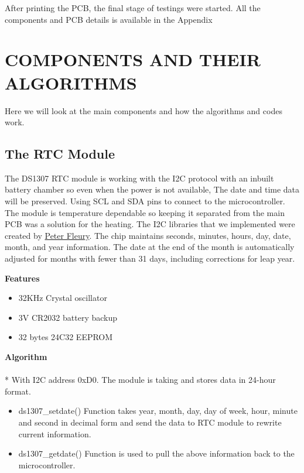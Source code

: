 After printing the PCB, the final stage of testings were started. All the components and PCB details is available in the Appendix

\section{COMPONENTS AND THEIR ALGORITHMS}

Here we will look at the main components and how the algorithms and codes work.

\subsection{The RTC Module}

The DS1307 RTC module is working with the I2C protocol with an inbuilt battery chamber so even when the power is not available, The date and time data will be preserved. Using SCL and SDA pins to connect to the microcontroller. The module is temperature dependable so keeping it separated from the main PCB was a solution for the heating. The I2C libraries that we implemented were created by \href{http://jump.to/fleury}{Peter Fleury}. The chip maintains seconds, minutes, hours, day, date, month, and year information. The date at the end of the month is automatically adjusted for months with fewer than 31 days, including corrections for leap year.

\Large \textbf{Features}
\normalsize
\begin{itemize}
  \item 32KHz Crystal oscillator 
  \item 3V CR2032 battery backup
  \item 32 bytes 24C32 EEPROM	
\end{itemize}
\Large \textbf{Algorithm}\\[0.1cm]
\\*
\normalsize{With I2C address 0xD0. The module is taking and stores data in 24-hour format.}
\begin{itemize}
  \item ds1307\_setdate() Function takes year, month, day, day of week, hour, minute and second in decimal form and send the data to RTC module to rewrite current information. 
  \item ds1307\_getdate() Function is used to pull the above information back to the microcontroller.
\end{itemize}

